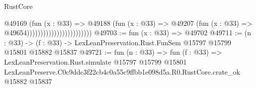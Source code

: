 \begin{lexlean}{RustCore}
\begin{coremodule}
                                            @49169
                                              (fun (x : @33) =>
                                              @49188
                                                (fun (x : @33) =>
                                                @49207
                                                  (fun (x : @33) => @49654))))))))))))))))))))))))
@49703 := fun (x : @33) => @49702
@49711 := (n : @33) ->
  (f : @33) -> LexLeanPreservation.Rust.FunSem @15797 @15799 @15801 @15882 @15837
@49721 := fun (n : @33) =>
  fun (f : @33) =>
  LexLeanPreservation.Rust.simulate
    @15797
    @15799
    @15801
    LexLeanPreserve.C0c9ddc3f22cb4c0a55c9ffbb1e098d5a.R0.RustCore.crate_ok
    @15882
    @15837
\end{coremodule}
\end{lexlean}

